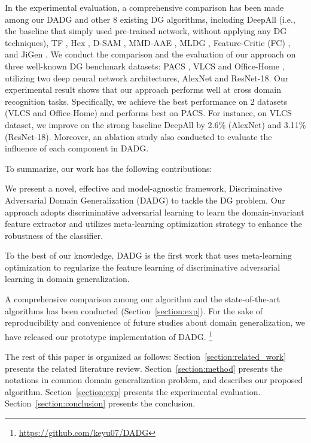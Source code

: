 \documentclass[twocolumn,preprint]{elsarticle}
\begin{document}
In the experimental evaluation, a comprehensive comparison has been made among our DADG and other 8 existing DG algorithms, including DeepAll (i.e., the baseline that simply used pre-trained network, without applying any DG techniques), TF \cite{tf}, Hex \cite{hex}, D-SAM \cite{dsam}, MMD-AAE \cite{mmd-aae}, MLDG \cite{mldg}, Feature-Critic (FC) \cite{feature-critic}, and JiGen \cite{jigsaw}. We conduct the comparison and the evaluation of our approach on three well-known DG benchmark datasets: PACS \cite{tf}, VLCS \cite{VLCS} and Office-Home \cite{office-home}, utilizing two deep neural network architectures, AlexNet and ResNet-18. Our experimental result shows that our approach performs well at cross domain recognition tasks. Specifically, we achieve the best performance on 2 datasets (VLCS and Office-Home) and performs  best on PACS. For instance, on VLCS dataset, we improve on the strong baseline DeepAll by 2.6\% (AlexNet) and 3.11\% (ResNet-18). Moreover, an ablation study also conducted to evaluate the influence of each component in DADG.

To summarize, our work has the following contributions:


 We present a novel, effective and model-agnostic framework, Discriminative Adversarial Domain Generalization (DADG) to tackle the DG problem. Our approach adopts discriminative adversarial learning to learn the domain-invariant feature extractor and utilizes meta-learning optimization strategy to enhance the robustness of the classifier.

 To the best of our knowledge, DADG is the first work that uses meta-learning optimization to regularize the feature learning of discriminative adversarial learning in domain generalization. 

 A comprehensive comparison among our algorithm and the state-of-the-art algorithms has been conducted (Section~\ref{section:exp}). For the sake of reproducibility and convenience of future studies about domain generalization, we have released our prototype implementation of DADG. \footnote[1]{\url{https://github.com/keyu07/DADG}}

The rest of this paper is organized as follows:
Section~\ref{section:related_work} presents the related literature review. 
Section~\ref{section:method} presents the notations in common domain generalization problem, and describes our proposed algorithm. 
Section~\ref{section:exp} presents the experimental evaluation. 
Section~\ref{section:conclusion} presents the conclusion.
\end{document}
